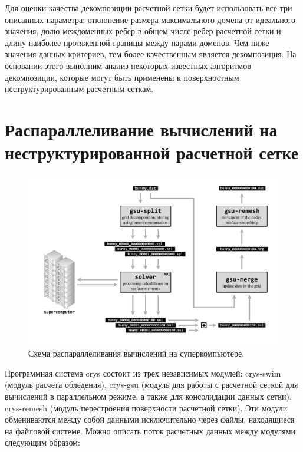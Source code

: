 \documentclass[
11pt,%
tightenlines,%
twoside,%
onecolumn,%
nofloats,%
nobibnotes,%
nofootinbib,%
superscriptaddress,%
noshowpacs,%
centertags]%
{revtex4}
\begin{document}
Для оценки качества декомпозиции расчетной сетки будет использовать все три описанных параметра:    отклонение размера максимального домена от идеального значения,    долю междоменных ребер в общем числе ребер расчетной сетки и    длину наиболее протяженной границы между парами доменов. Чем ниже значения данных критериев, тем более качественным является декомпозиция. На основании этого выполним анализ некоторых известных алгоритмов декомпозиции, которые могут быть применены к поверхностным неструктурированным расчетным сеткам.

\section{Распараллеливание вычислений на неструктурированной расчетной сетке}

\begin{figure}[h]
\includegraphics[width=1.0\textwidth]{pics/02-scheme.pdf}
\caption{Схема распараллеливания вычислений на суперкомпьютере.}\label{fig:02-scheme}
\end{figure}

Программная система crys состоит из трех независимых модулей: crys-swim (модуль расчета обледения), crys-gsu (модуль для работы с расчетной сеткой для вычислений в параллельном режиме, а также для консолидации данных сетки), crys-remesh (модуль перестроения поверхности расчетной сетки). Эти модули обмениваются между собой данными исключительно через файлы, находящиеся на файловой системе.
Можно описать поток расчетных данных между модулями следующим образом:
\end{document}
